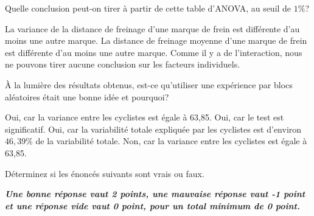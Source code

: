 \begin{questions}
\vspace{0.5cm}
\question[3]\label{AOVblocs2} Quelle conclusion peut-on tirer à partir de cette table d'ANOVA, au seuil de $1\%$?

\begin{checkboxes}
    \choice La variance de la distance de freinage d'une marque de frein est différente d'au moins une autre marque.
\correctchoice La distance de freinage moyenne d'une marque de frein est différente d'au moins une autre marque.
\choice Comme il y a de l'interaction, nous ne pouvons tirer aucune conclusion sur les facteurs individuels.
\end{checkboxes}


\question[3]\label{AOVblocs3} À la lumière des résultats obtenus, est-ce qu'utiliser une expérience par blocs aléatoires était une bonne idée et pourquoi?

\begin{checkboxes}
\choice Oui, car la variance entre les cyclistes est égale à 63,85.
\choice Oui, car le test est significatif.
\correctchoice Oui, car la variabilité totale expliquée par les cyclistes est d'environ $46,39\%$ de la variabilité totale.
\choice Non, car la variance entre les cyclistes est égale à 63,85.
\end{checkboxes}


\newpage

\question[10] Déterminez si les énoncés suivants sont vrais ou faux.

\textbf{\textit{Une bonne réponse vaut 2 points, une mauvaise réponse vaut -1 point et une réponse vide vaut 0 point, pour un total minimum de 0 point.}}
\smallskip

\end{questions}
